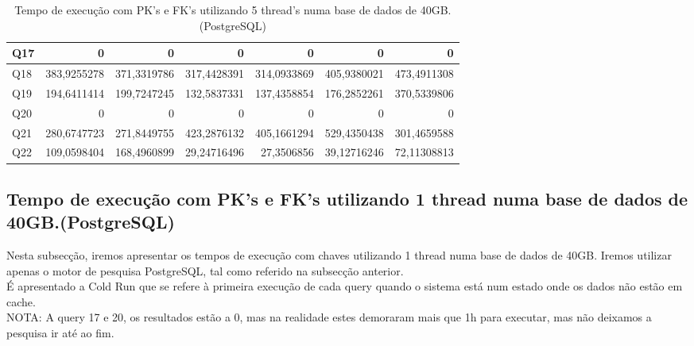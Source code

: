 \documentclass{article}
\begin{document}
\begin{table}[H]
{\begin{tabular}{|l|r|r|r|r|r|r|}
        Q17&	0	&0	&0&	0	&0	&0\\ \hline
        Q18&	383,9255278	&371,3319786&	317,4428391&	314,0933869	&405,9380021&	473,4911308\\ \hline
        Q19&	194,6411414	&199,7247245&	132,5837331&	137,4358854	&176,2852261&	370,5339806\\ \hline
        Q20&	0	&0	&0&	0	&0	&0 \\ \hline
        Q21&	280,6747723	&271,8449755&	423,2876132	&405,1661294	&529,4350438	&301,4659588\\ \hline
        Q22&	109,0598404&	168,4960899&	29,24716496&	27,3506856	&39,12716246	&72,11308813\\ \hline
    \end{tabular}}
    \caption{Tempo de execução com PK's e FK's utilizando 5 thread's numa base de dados de 40GB.(PostgreSQL)}
    \label{tab:BC_Table6}
  \end{table}



  \subsection{Tempo de execução com PK's e FK's utilizando 1 thread numa base de dados de 40GB.(PostgreSQL)}
  \quad Nesta subsecção, iremos apresentar os tempos de execução com chaves utilizando 1 thread numa base de dados de 40GB. Iremos utilizar apenas o motor de pesquisa PostgreSQL, tal como referido na subsecção anterior.\\ 
  \quad É apresentado a Cold Run que se refere à primeira execução de cada query quando o sistema está num estado onde os dados não estão em cache.\\
  NOTA: A query 17 e 20, os resultados estão a 0, mas na realidade estes demoraram mais que 1h para executar, mas não deixamos a pesquisa ir até ao fim.
  
\end{document}
